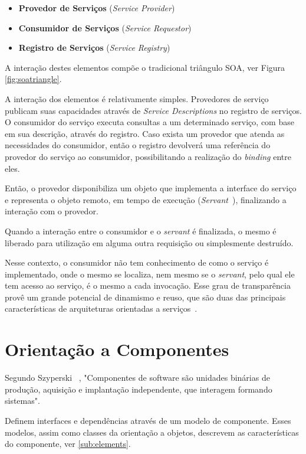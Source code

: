 \begin{itemize}
 \item \textbf{Provedor de Serviços} (\textit{Service Provider})
 \item \textbf{Consumidor de Serviços} (\textit{Service Requestor})
 \item \textbf{Registro de Serviços} (\textit{Service Registry})
\end{itemize}

A interação destes elementos compõe o tradicional triângulo SOA, ver Figura \ref{fig:soatriangle}. 

A interação dos elementos é relativamente simples. Provedores de serviço publicam suas capacidades através de \textit{Service Descriptions} no registro de serviços.
O consumidor do serviço executa consultas a um determinado serviço, com base em sua descrição, através do registro. Caso exista um provedor que atenda as necessidades do consumidor, então o registro devolverá uma referência do provedor do serviço ao consumidor, possibilitando a realização do \textit{binding} entre eles. 

Então, o provedor disponibiliza um objeto que implementa a interface do serviço e representa o objeto remoto, em tempo de execução (\textit{Servant}~\cite{volter2005remoting}), finalizando a interação com o provedor. 

Quando a interação entre o consumidor e o \textit{servant} é finalizada, o mesmo é liberado para utilização em alguma outra requisição ou simplesmente destruído.

Nesse contexto, o consumidor não tem conhecimento de como o serviço é implementado, onde o mesmo se localiza, nem mesmo se o \textit{servant}, pelo qual ele tem acesso ao serviço, é o mesmo a cada invocação. Esse grau de transparência provê um grande potencial de dinamismo e reuso, que são duas das principais características de arquiteturas orientadas a serviços~\cite{davis2009open}.


\section{Orientação a Componentes}
\label{sec:component}
Segundo Szyperski ~\cite{szyperski2002component}, "Componentes de software são unidades binárias de produção, aquisição e implantação independente, que interagem formando sistemas".

Definem interfaces e dependências através de um modelo de componente. Esses modelos, assim como classes da orientação a objetos, descrevem as características do componente, ver \ref{sub:elements}.

